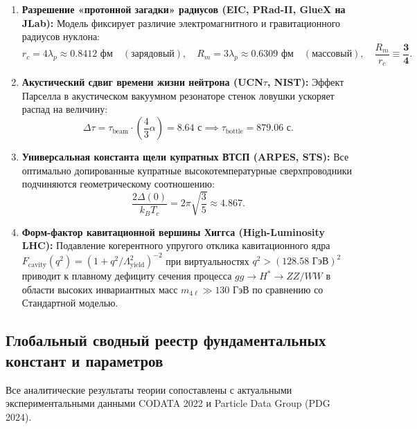 \documentclass[11pt,a4paper]{article}
\theoremstyle{definition}
\theoremstyle{remark}
\begin{document}
\begin{enumerate}
    \item \textbf{Разрешение «протонной загадки» радиусов (EIC, PRad-II, GlueX на JLab):}
    Модель фиксирует различие электромагнитного и гравитационного радиусов нуклона:
    \begin{equation}
        r_c = 4\lambda_p \approx \mathbf{0.8412\text{ фм}} \quad (\text{зарядовый}), \quad R_m = 3\lambda_p \approx \mathbf{0.6309\text{ фм}} \quad (\text{массовый}), \quad \frac{R_m}{r_c} \equiv \boldsymbol{\frac{3}{4}}.
    \end{equation}

    \item \textbf{Акустический сдвиг времени жизни нейтрона (UCN$\tau$, NIST):}
    Эффект Парселла в акустическом вакуумном резонаторе стенок ловушки ускоряет распад на величину:
    \begin{equation}
        \Delta \tau = \tau_{\mathrm{beam}} \cdot \left(\frac{4}{3}\alpha\right) = \mathbf{8.64\text{ с}} \implies \tau_{\mathrm{bottle}} = \mathbf{879.06\text{ с}}.
    \end{equation}

    \item \textbf{Универсальная константа щели купратных ВТСП (ARPES, STS):}
    Все оптимально допированные купратные высокотемпературные сверхпроводники подчиняются геометрическому соотношению:
    \begin{equation}
        \frac{2\Delta(0)}{k_B T_c} = 2\pi \sqrt{\frac{3}{5}} \approx \mathbf{4.867}.
    \end{equation}

    \item \textbf{Форм-фактор кавитационной вершины Хиггса (High-Luminosity LHC):}
    Подавление когерентного упругого отклика кавитационного ядра $F_{\mathrm{cavity}}(q^2) = (1 + q^2/\Lambda_{\mathrm{yield}}^2)^{-2}$ при виртуальностях $q^2 > (128.58\text{ ГэВ})^2$ приводит к плавному дефициту сечения процесса $gg \to H^* \to ZZ/WW$ в области высоких инвариантных масс $m_{4\ell} \gg 130\text{ ГэВ}$ по сравнению со Стандартной моделью.
\end{enumerate}

\subsection{Глобальный сводный реестр фундаментальных констант и параметров}
Все аналитические результаты теории сопоставлены с актуальными экспериментальными данными CODATA 2022 и Particle Data Group (PDG 2024).
\end{document}
